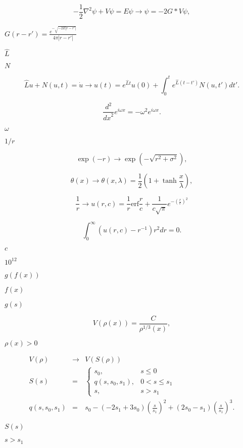 \documentclass{article}
\begin{document}
\[
- \frac{1}{2} \nabla^{2} \psi + V\psi = E \psi \to \psi = -2G \ast V\psi,
\]
\pagebreak

$G(r-r')=\frac{e^{-\sqrt{-2E|r-r'|}}}{4\pi |r-r'|} $
\pagebreak

$\hat{L}$
\pagebreak

$N$
\pagebreak

\[
\hat{L}u + N(u,t) = \dot{u} \to u(t) = e^{\hat{L} t} u(0) + \int _{0}^{t} e^{\hat{L} (t-t')} N(u,t') \mathit{d}t'.
\]
\pagebreak

\[
\frac{d^{2}}{\mathit{dx}^{2}}e^{i\omega x}=-\omega ^{2}e^{i\omega x}.
\]
\pagebreak

$\omega$
\pagebreak

$1/r$
\pagebreak

\[
\exp(-r) \to \exp (-\sqrt{r^{2}+\sigma ^{2}}),
\]
\pagebreak

\[
\theta(x) \to \theta(x, \lambda) = \frac{1}{2} (1 + \tanh\frac{x}{\lambda}),
\]
\pagebreak

\[
\frac{1}{r} \to u(r,c) = \frac{1}{r} \mathrm{erf} \frac{r}{c} + \frac{1}{c\sqrt{\pi}} e^{-\left( \frac{r}{c} \right)^{2}}
\]
\pagebreak

\[
\int_{0}^{\infty} \left(u(r, c) - r^{-1}\right) r^{2} d\mathit{r} = 0.
\]
\pagebreak

$c$
\pagebreak

$10^{12}$
\pagebreak

$g(f(x))$
\pagebreak

$f(x)$
\pagebreak

$g(s)$
\pagebreak

\[
V(\rho(x)) = \frac{C}{\rho^{1/3}(x)},
\]
\pagebreak

$\rho (x)>0$
\pagebreak

\begin{eqnarray*}
V(\rho) & \to & V(S(\rho)) \\
S(s) & = & \left\{ \begin{array}{ll} s_{0}, & s\le 0 \\ q(s, s_{0}, s_{1}), & 0 < s \le s_{1} \\ s, & s > s_{1} \end{array} \right. \\
q(s, s_{0}, s_{1}) & = & s_{0} - (-2s_{1} + 3s_{0}) \left( \frac{s}{s_{1}} \right)^{2} + (2s_{0} - s_{1}) \left(\frac{s}{s_{1}}\right)^{3}.
\end{eqnarray*}
\pagebreak

$S(s)$
\pagebreak

$s>s_{1}$
\pagebreak
\end{document}
